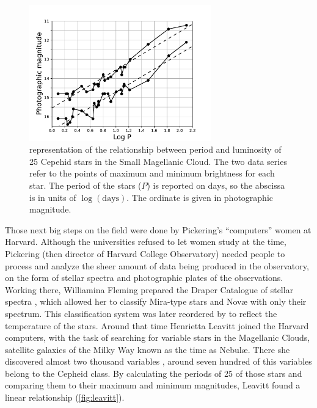 \begin{figure}
	\centering
	\includegraphics[width=0.7\textwidth]{img/leavitt.pdf}
	\caption[Leavitt PL relation]{\cite{Leavitt1912} representation of the relationship between period and luminosity 
	of 25 Cepehid stars in the Small Magellanic Cloud.
	The two data series refer to the points of maximum and minimum brightness for each star. 
	The period of the stars ($P$) is reported on days, so the abscissa is in units of $\log(\text{days})$.
	The ordinate is given in photographic magnitude.
	}
	\label{fig:leavitt}
\end{figure}

Those next big steps on the field were done by Pickering's ``computers'' women at Harvard. 
Although the universities refused to let women study at the time, Pickering (then director of Harvard College Observatory) 
needed people to process and analyze the sheer amount of data being produced in the observatory, 
on the form of stellar spectra and photographic plates of the observations.
Working there, Williamina Fleming prepared the Draper Catalogue of stellar spectra \citep{Pickering1890,Maury1897}, 
which allowed her to classify Mira-type stars and Nov\ae{} with only their spectrum. 
This classification system was later reordered by \cite{Canon1901} to reflect the temperature of the stars.
Around that time Henrietta Leavitt joined the Harvard computers, 
with the task of searching for variable stars in the Magellanic Clouds, satellite galaxies of the Milky Way known as the time as Nebul\ae{}.
There she discovered almost two thousand variables \citep{Leavitt1908}, around seven hundred of this variables belong to the Cepheid class. 
By calculating the periods of 25 of those stars and comparing them to their maximum and minimum magnitudes, Leavitt found a linear relationship (\autoref{fig:leavitt}).


